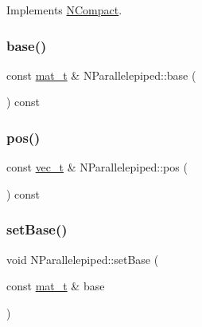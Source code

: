 Implements \mbox{\hyperlink{class_n_compact_a816bb4976567a7bfed57763ce717b685}{N\+Compact}}.

\mbox{\label{class_n_parallelepiped_a59a297106e5f9a9d8cc672dbe685eced}} 
\subsubsection{\texorpdfstring{base()}{base()}}
{\footnotesize\ttfamily const \mbox{\hyperlink{_n_p_matrix_8h_a44dfb60c1e03b44e98a332fb2ae71947}{mat\+\_\+t}} \& N\+Parallelepiped\+::base (\begin{DoxyParamCaption}{ }\end{DoxyParamCaption}) const}

\mbox{\label{class_n_parallelepiped_a15e7d385482e105caad884697aa2a9ab}} 
\subsubsection{\texorpdfstring{pos()}{pos()}}
{\footnotesize\ttfamily const \mbox{\hyperlink{group___n_algebra_ga0a2cfc67e738a3d73e4f12098c4c07f6}{vec\+\_\+t}} \& N\+Parallelepiped\+::pos (\begin{DoxyParamCaption}{ }\end{DoxyParamCaption}) const}

\mbox{\label{class_n_parallelepiped_af50551bef2ecb0d6628a6668824bb2ac}} 
\subsubsection{\texorpdfstring{setBase()}{setBase()}}
{\footnotesize\ttfamily void N\+Parallelepiped\+::set\+Base (\begin{DoxyParamCaption}\item[{const \mbox{\hyperlink{_n_p_matrix_8h_a44dfb60c1e03b44e98a332fb2ae71947}{mat\+\_\+t}} \&}]{base }\end{DoxyParamCaption})}

\mbox{\label{class_n_parallelepiped_a29f55165985609afbc16b91c4143771d}} 
